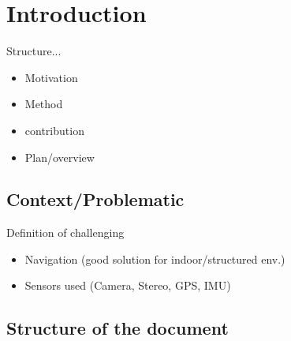 \chapter*{Introduction}

Structure...
\begin{itemize}
    \item Motivation
    \item Method
    \item contribution
    \item Plan/overview
\end{itemize}

\section{Context/Problematic}
\label{sec:chap1_context}
Definition of challenging
\begin{itemize}
    \item Navigation (good solution for indoor/structured env.)
    \item Sensors used (Camera, Stereo, GPS, IMU)
\end{itemize}

\section{Structure of the document}
\label{sec:structure_of_the_document}

